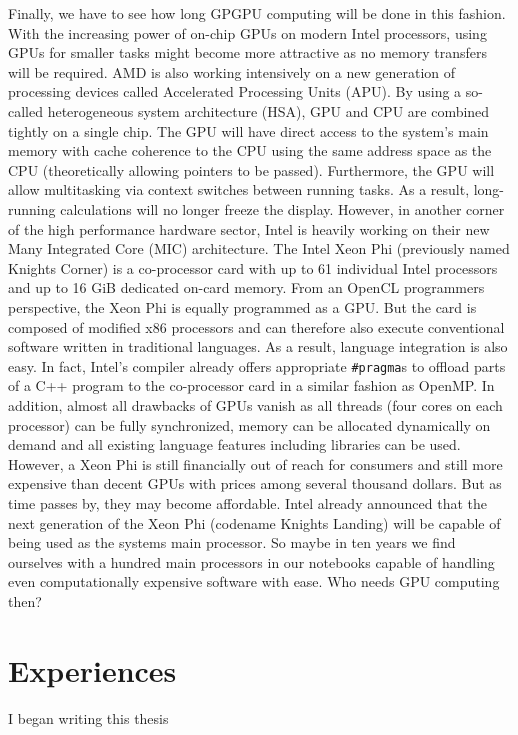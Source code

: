 Finally, we have to see how long GPGPU computing will be done in this fashion. With the increasing power of on-chip GPUs on modern Intel processors, using GPUs for smaller tasks might become more attractive as no memory transfers will be required. AMD is also working intensively on a new generation of processing devices called Accelerated Processing Units (APU). By using a so-called heterogeneous system architecture (HSA), GPU and CPU are combined tightly on a single chip. The GPU will have direct access to the system's main memory with cache coherence to the CPU using the same address space as the CPU (theoretically allowing pointers to be passed). Furthermore, the GPU will allow multitasking via context switches between running tasks. As a result, long-running calculations will no longer freeze the display.
However, in another corner of the high performance hardware sector, Intel is heavily working on their new Many Integrated Core (MIC) architecture. The Intel Xeon Phi (previously named Knights Corner) is a co-processor card with up to 61 individual Intel processors and up to 16 GiB dedicated on-card memory. From an OpenCL programmers perspective, the Xeon Phi is equally programmed as a GPU. But the card is composed of modified x86 processors and can therefore also execute conventional software written in traditional languages. As a result, language integration is also easy. In fact, Intel's compiler already offers appropriate \lstinline!#pragma!s to offload parts of a C++ program to the co-processor card in a similar fashion as OpenMP. In addition, almost all drawbacks of GPUs vanish as all threads (four cores on each processor) can be fully synchronized, memory can be allocated dynamically on demand and all existing language features including libraries can be used. However, a Xeon Phi is still financially out of reach for consumers and still more expensive than decent GPUs with prices among several thousand dollars. But as time passes by, they may become affordable. Intel already announced that the next generation of the Xeon Phi (codename Knights Landing) will be capable of being used as the systems main processor. So maybe in ten years we find ourselves with a hundred main processors in our notebooks capable of handling even computationally expensive software with ease. Who needs GPU computing then?

\section{Experiences}

I began writing this thesis 